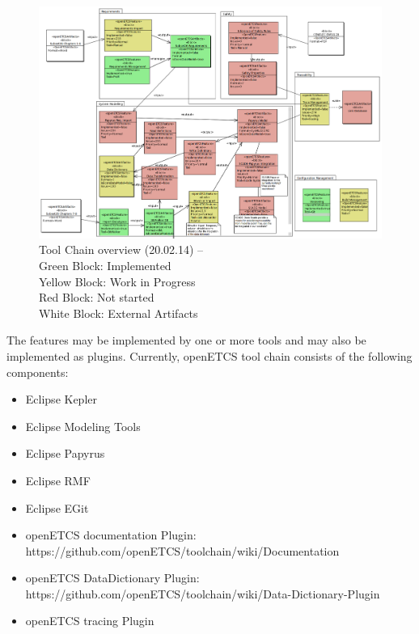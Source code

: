 \begin{figure}[htbp]
\includegraphics[width=\textwidth]{ToolChainmodel}
\caption{\label{fig:overview} Tool Chain overview (20.02.14) -- \\
  Green Block: Implemented \\
  Yellow Block: Work in Progress \\
  Red Block: Not started \\
  White Block: External Artifacts} 
\end{figure}
The features may be implemented by one or more tools and may also be implemented as plugins.
Currently, openETCS tool chain consists of the following components:
\begin{itemize}
\item Eclipse Kepler
\item Eclipse Modeling Tools
\item Eclipse Papyrus
\item Eclipse RMF
\item Eclipse EGit
\item openETCS documentation Plugin: https://github.com/openETCS/toolchain/wiki/Documentation
\item openETCS DataDictionary Plugin: https://github.com/openETCS/toolchain/wiki/Data-Dictionary-Plugin
\item openETCS tracing Plugin
\end{itemize}

